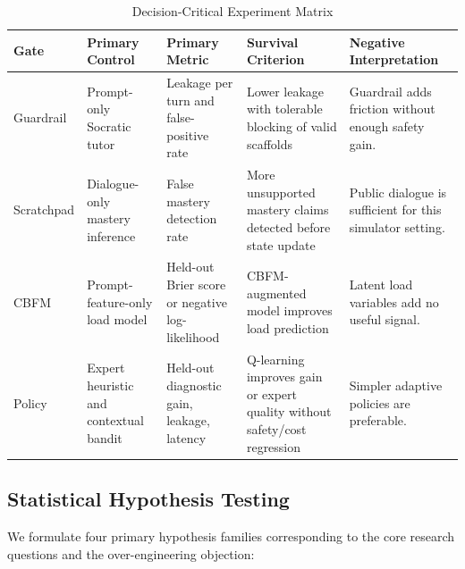 \documentclass[11pt,a4paper]{report}
\begin{document}
\begin{table}[htbp]
\centering
\small
\begin{tabularx}{\textwidth}{P{0.16\textwidth}YYYY}
\toprule
\textbf{Gate} & \textbf{Primary Control} & \textbf{Primary Metric} & \textbf{Survival Criterion} & \textbf{Negative Interpretation} \\
\midrule
Guardrail & Prompt-only Socratic tutor & Leakage per turn and false-positive rate & Lower leakage with tolerable blocking of valid scaffolds & Guardrail adds friction without enough safety gain. \\
\midrule
Scratchpad & Dialogue-only mastery inference & False mastery detection rate & More unsupported mastery claims detected before state update & Public dialogue is sufficient for this simulator setting. \\
\midrule
CBFM & Prompt-feature-only load model & Held-out Brier score or negative log-likelihood & CBFM-augmented model improves load prediction & Latent load variables add no useful signal. \\
\midrule
Policy & Expert heuristic and contextual bandit & Held-out diagnostic gain, leakage, latency & Q-learning improves gain or expert quality without safety/cost regression & Simpler adaptive policies are preferable. \\
\bottomrule
\end{tabularx}
\caption{Decision-Critical Experiment Matrix}
\label{tab:critical_gate_matrix}
\end{table}

\subsection{Statistical Hypothesis Testing}
We formulate four primary hypothesis families corresponding to the core research questions and the over-engineering objection:
\end{document}
